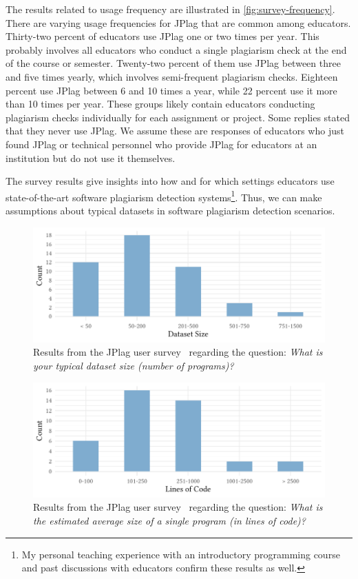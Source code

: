The results related to usage frequency are illustrated in \autoref{fig:survey-frequency}.
There are varying usage frequencies for JPlag that are common among educators.
Thirty-two percent of educators use JPlag one or two times per year. This probably involves all educators who conduct a single plagiarism check at the end of the course or semester.
Twenty-two percent of them use JPlag between three and five times yearly, which involves semi-frequent plagiarism checks.
Eighteen percent use JPlag between 6 and 10 times a year, while 22 percent use it more than 10 times per year.
These groups likely contain educators conducting plagiarism checks individually for each assignment or project.
Some replies stated that they never use JPlag. We assume these are responses of educators who just found JPlag or technical personnel who provide JPlag for educators at an institution but do not use it themselves.

The survey results give insights into how and for which settings educators use state-of-the-art software plagiarism detection systems\footnote{My personal teaching experience with an introductory programming course and past discussions with educators confirm these results as well.}.
Thus, we can make assumptions about typical datasets in software plagiarism detection scenarios.

\begin{figure}[p]
\centering
\includegraphics[width=\linewidth]{figures/survey/survey-dataset_size.pdf}
\caption[JPlag Survey: Dataset Size]{Results from the JPlag user survey~\cite{JPlagSurvey2024} regarding the question: \textit{What is your typical dataset size (number of programs)?}}
\label{fig:survey-dataset-size}
\end{figure}

\begin{figure}[p]
\centering
\includegraphics[width=\linewidth]{figures/survey/survey-program_size.pdf}
\caption[JPlag Survey: Program Size]{Results from the JPlag user survey~\cite{JPlagSurvey2024} regarding the question: \textit{What is the estimated average size of a single program (in lines of code)?}}
\label{fig:survey-program-size}
\end{figure}

